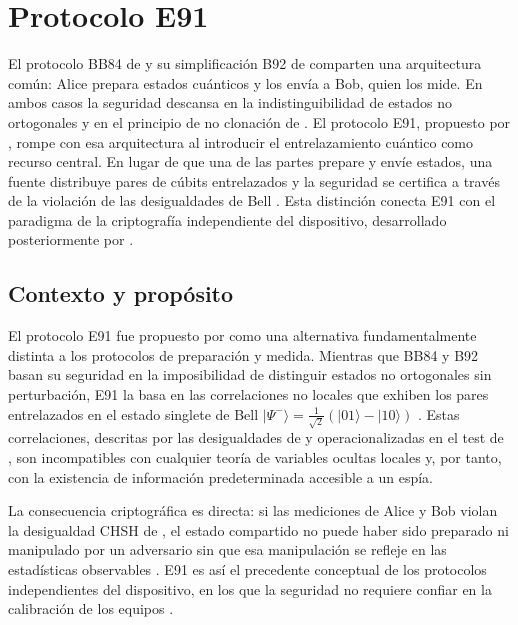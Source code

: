 \section{Protocolo E91}

El protocolo BB84 de \cite{bennett1984} y su simplificación B92 de \cite{bennett1992} comparten una arquitectura común: Alice prepara estados cuánticos y los envía a Bob, quien los mide. En ambos casos la seguridad descansa en la indistinguibilidad de estados no ortogonales y en el principio de no clonación de \cite{wootters1982}. El protocolo E91, propuesto por \cite{ekert1991}, rompe con esa arquitectura al introducir el entrelazamiento cuántico como recurso central. En lugar de que una de las partes prepare y envíe estados, una fuente distribuye pares de cúbits entrelazados y la seguridad se certifica a través de la violación de las desigualdades de Bell \citep{bell1964,clauser1969}. Esta distinción conecta E91 con el paradigma de la criptografía independiente del dispositivo, desarrollado posteriormente por \cite{acin2007}.

\subsection{Contexto y propósito}

El protocolo E91 fue propuesto por \cite{ekert1991} como una alternativa fundamentalmente distinta a los protocolos de preparación y medida. Mientras que BB84 \citep{bennett1984} y B92 \citep{bennett1992} basan su seguridad en la imposibilidad de distinguir estados no ortogonales sin perturbación, E91 la basa en las correlaciones no locales que exhiben los pares entrelazados en el estado singlete de Bell $|\Psi^-\rangle = \frac{1}{\sqrt{2}}(|01\rangle - |10\rangle)$ \citep{ekert1991,gisin2002}. Estas correlaciones, descritas por las desigualdades de \cite{bell1964} y operacionalizadas en el test de \cite{clauser1969}, son incompatibles con cualquier teoría de variables ocultas locales y, por tanto, con la existencia de información predeterminada accesible a un espía.

La consecuencia criptográfica es directa: si las mediciones de Alice y Bob violan la desigualdad CHSH de \cite{clauser1969}, el estado compartido no puede haber sido preparado ni manipulado por un adversario sin que esa manipulación se refleje en las estadísticas observables \citep{ekert1991,acin2007}. E91 es así el precedente conceptual de los protocolos independientes del dispositivo, en los que la seguridad no requiere confiar en la calibración de los equipos \citep{acin2007,scarani2009}.

